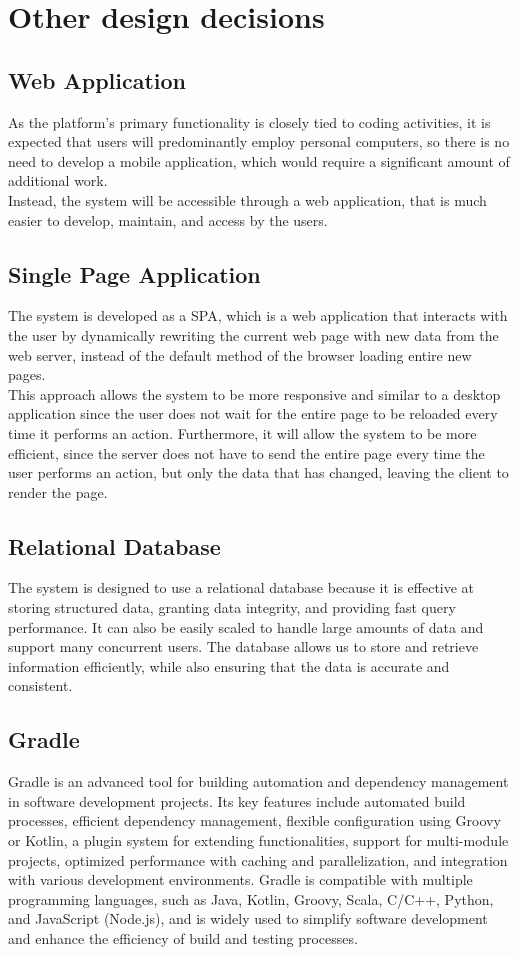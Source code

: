\section{Other design decisions}
\subsection{Web Application}
As the platform's primary functionality is closely tied to coding activities, it is expected that users will predominantly employ personal computers, so there is no need to develop a mobile application, which would require a significant amount of additional work. \\
Instead, the system will be accessible through a web application, that is much easier to develop, maintain, and access by the users.

\subsection{Single Page Application}
The system is developed as a SPA, which is a web application that interacts with the user by dynamically rewriting the current web page with new data from the web server, instead of the default method of the browser loading entire new pages.\\
This approach allows the system to be more responsive and similar to a desktop application since the user does not wait for the entire page to be reloaded every time it performs an action.
Furthermore, it will allow the system to be more efficient, since the server does not have to send the entire page every time the user performs an action, but only the data that has changed, leaving the client to render the page.

\subsection{Relational Database}
The system is designed to use a relational database because it is effective at storing structured data, granting data integrity, and providing fast query performance.
It can also be easily scaled to handle large amounts of data and support many concurrent users.
The database allows us to store and retrieve information efficiently, while also ensuring that the data is accurate and consistent.

\subsection{Gradle}
Gradle is an advanced tool for building automation and dependency management in software development projects.
Its key features include automated build processes, efficient dependency management, flexible configuration using Groovy or Kotlin, a plugin system for extending functionalities, support for multi-module projects, optimized performance with caching and parallelization, and integration with various development environments.
Gradle is compatible with multiple programming languages, such as Java, Kotlin, Groovy, Scala, C/C++, Python, and JavaScript (Node.js), and is widely used to simplify software development and enhance the efficiency of build and testing processes.